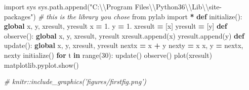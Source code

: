 \documentclass[]{article}
\newenvironment{Shaded}{\begin{snugshade}}{\end{snugshade}}
\newcommand{\KeywordTok}[1]{\textcolor[rgb]{0.13,0.29,0.53}{\textbf{#1}}}
\newcommand{\DecValTok}[1]{\textcolor[rgb]{0.00,0.00,0.81}{#1}}
\newcommand{\CharTok}[1]{\textcolor[rgb]{0.31,0.60,0.02}{#1}}
\newcommand{\StringTok}[1]{\textcolor[rgb]{0.31,0.60,0.02}{#1}}
\newcommand{\ImportTok}[1]{#1}
\newcommand{\CommentTok}[1]{\textcolor[rgb]{0.56,0.35,0.01}{\textit{#1}}}
\newcommand{\ControlFlowTok}[1]{\textcolor[rgb]{0.13,0.29,0.53}{\textbf{#1}}}
\newcommand{\OperatorTok}[1]{\textcolor[rgb]{0.81,0.36,0.00}{\textbf{#1}}}
\newcommand{\BuiltInTok}[1]{#1}
\newcommand{\NormalTok}[1]{#1}
\begin{document}
\begin{Shaded}
\begin{Highlighting}[]
\ImportTok{import}\NormalTok{ sys}
\NormalTok{sys.path.append(}\StringTok{"C:}\CharTok{\textbackslash{}\textbackslash{}}\StringTok{Program Files}\CharTok{\textbackslash{}\textbackslash{}}\StringTok{Python36}\CharTok{\textbackslash{}\textbackslash{}}\StringTok{Lib}\CharTok{\textbackslash{}\textbackslash{}}\StringTok{site-packages"}\NormalTok{) }\CommentTok{# this is the library you chose}
\ImportTok{from}\NormalTok{ pylab }\ImportTok{import} \OperatorTok{*}
\KeywordTok{def}\NormalTok{ initialize():}
    \KeywordTok{global}\NormalTok{ x, y, xresult, yresult}
\NormalTok{    x }\OperatorTok{=} \DecValTok{1}\NormalTok{.}
\NormalTok{    y }\OperatorTok{=} \DecValTok{1}\NormalTok{.}
\NormalTok{    xresult }\OperatorTok{=}\NormalTok{ [x]}
\NormalTok{    yresult }\OperatorTok{=}\NormalTok{ [y]}
\KeywordTok{def}\NormalTok{ observe():}
    \KeywordTok{global}\NormalTok{ x, y, xresult, yresult}
\NormalTok{    xresult.append(x)}
\NormalTok{    yresult.append(y)}
\KeywordTok{def}\NormalTok{ update():}
    \KeywordTok{global}\NormalTok{ x, y, xresult, yresult}
\NormalTok{    nextx }\OperatorTok{=}\NormalTok{ x }\OperatorTok{+}\NormalTok{ y}
\NormalTok{    nexty }\OperatorTok{=}\NormalTok{ x}
\NormalTok{    x, y }\OperatorTok{=}\NormalTok{ nextx, nexty}
\NormalTok{initialize()}
\ControlFlowTok{for}\NormalTok{ t }\KeywordTok{in} \BuiltInTok{range}\NormalTok{(}\DecValTok{30}\NormalTok{):}
\NormalTok{  update()}
\NormalTok{  observe()}
\NormalTok{plot(xresult)}
\NormalTok{matplotlib.pyplot.show()}
\end{Highlighting}
\end{Shaded}

\begin{Shaded}
\begin{Highlighting}[]
\CommentTok{# knitr::include_graphics('figures/firstfig.png')}
\end{Highlighting}
\end{Shaded}
\end{document}
